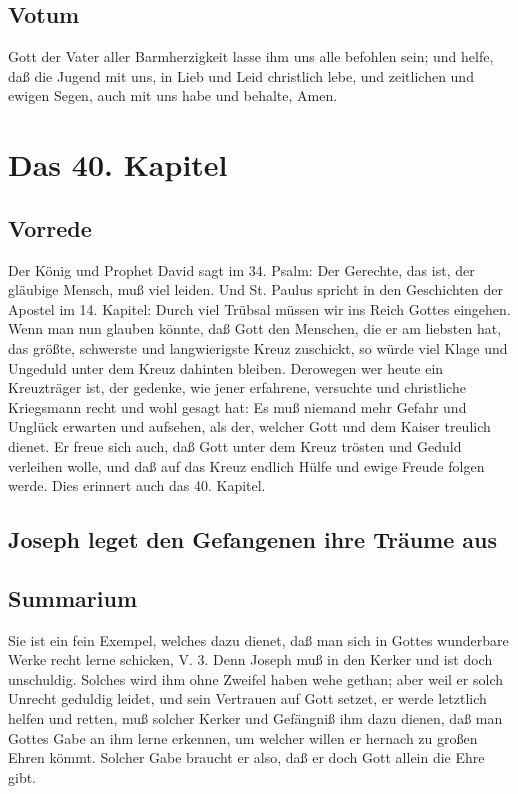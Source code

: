 \section{Votum}

Gott der Vater aller Barmherzigkeit lasse ihm uns alle befohlen sein; und helfe, daß die Jugend mit uns, in Lieb und Leid christlich lebe, und zeitlichen und ewigen Segen, auch mit uns habe und behalte, Amen.

\chapter{Das 40. Kapitel}

\section{Vorrede}

Der König und Prophet David sagt im 34. Psalm: Der Gerechte, das ist, der gläubige Mensch, muß viel leiden. Und St. Paulus spricht in den Geschichten der Apostel im 14. Kapitel: Durch viel Trübsal müssen wir ins Reich Gottes eingehen. Wenn man nun glauben könnte, daß Gott den Menschen, die er am liebsten hat, das größte, schwerste und langwierigste Kreuz zuschickt, so würde viel Klage und Ungeduld unter dem Kreuz dahinten bleiben. Derowegen wer heute ein Kreuzträger ist, der gedenke, wie jener erfahrene, versuchte und christliche Kriegsmann recht und wohl gesagt
hat: Es muß niemand mehr Gefahr und Unglück erwarten und aufsehen, als der, welcher Gott und dem Kaiser treulich dienet. Er freue sich auch, daß Gott unter dem Kreuz trösten und Geduld verleihen wolle, und daß auf das Kreuz endlich Hülfe und ewige Freude folgen werde. Dies erinnert auch das 40. Kapitel.

\section{Joseph leget den Gefangenen ihre Träume aus}

\section{Summarium}

Sie ist ein fein Exempel, welches dazu dienet, daß man sich in Gottes wunderbare Werke recht lerne schicken, V. 3. Denn Joseph muß in den Kerker und ist doch unschuldig. Solches wird ihm ohne Zweifel haben wehe gethan; aber weil er solch Unrecht geduldig leidet, und sein Vertrauen auf Gott setzet, er werde letztlich helfen und retten, muß solcher Kerker und Gefängniß ihm dazu dienen, daß man Gottes Gabe an ihm lerne erkennen, um welcher willen er hernach zu großen Ehren kömmt. Solcher Gabe braucht er also, daß er doch Gott allein die Ehre gibt.

